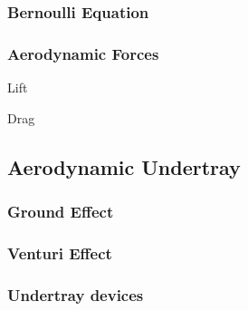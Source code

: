 \subsubsection{Bernoulli Equation}



\subsubsection{Aerodynamic Forces}
Lift

Drag



\subsection{Aerodynamic Undertray}
\subsubsection{Ground Effect}
\subsubsection{Venturi Effect}
\subsubsection{Undertray devices}
